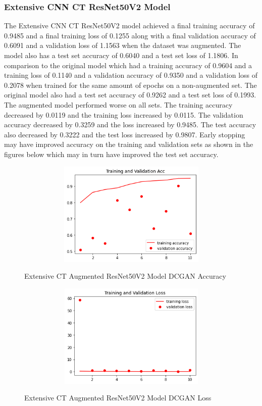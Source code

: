 \subsubsection{Extensive CNN CT ResNet50V2 Model}
The Extensive CNN CT ResNet50V2 model achieved a final training accuracy of 0.9485 and a final training loss of 0.1255 along with a final validation accuracy of 0.6091 and a validation loss of 1.1563 when the dataset was augmented.  The model also has a test set accuracy of 0.6040 and a test set loss of 1.1806.  In comparison to the original model which had a training accuracy of 0.9604 and a training loss of 0.1140 and a validation accuracy of 0.9350 and a validation loss of 0.2078  when trained for the same amount of epochs on a non-augmented set.  The original model also had a test set accuracy of 0.9262 and a test set loss of 0.1993.  The augmented model performed worse on all sets.  The training accuracy decreased by 0.0119 and the training loss increased by 0.0115. The validation accuracy decreased by 0.3259 and the loss increased by 0.9485. The test accuracy also decreased by 0.3222 and the test loss increased by 0.9807.  Early stopping may have improved accuracy on the training and validation sets as shown in the figures below which may in turn have improved the test set accuracy.
 \begin{figure}[H]
    \centering    \includegraphics[width=1\textwidth,height=5cm,keepaspectratio]{Images/ResNet50V2BaselineTrainingValidationAccuracyExtensiveCTAugmentedDCGAN.png}\\
    \caption{Extensive CT Augmented ResNet50V2 Model DCGAN Accuracy}
    \label{fig:Extensive CT Augmented ResNet50V2 Model DCGAN Accuracy}
\end{figure}
 \begin{figure}[H]
    \centering
    \includegraphics[width=1\textwidth,height=5cm,keepaspectratio]{Images/ResNet50V2BaselineTrainingValidationLossExtensiveCTAugmentedDCGAN.png}\\
    \caption{Extensive CT Augmented ResNet50V2 Model DCGAN Loss}
    \label{fig:Extensive CT Augmented ResNet50V2 Model DCGAN Loss}
\end{figure}
